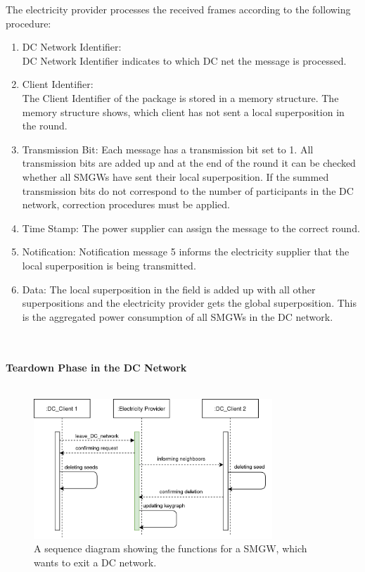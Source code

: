 The electricity provider processes the received frames according to the following procedure:\\
\begin{enumerate}
\item DC Network Identifier:\\
DC Network Identifier indicates to which DC net the message is processed.
\item Client Identifier:\\
The Client Identifier of the package is stored in a memory structure. The memory structure shows, which client has not sent a local superposition in the round.
\item Transmission Bit: Each message has a transmission bit set to 1. All transmission bits are added up and at the end of the round it can be checked whether all \gls{SMGW}s have sent their local superposition. If the summed transmission bits do not correspond to the number of participants in the DC network, correction procedures must be applied.
\item Time Stamp: The power supplier can assign the message to the correct round.
\item Notification: Notification message 5 informs the electricity supplier that the local superposition is being transmitted.
\item Data:
The local superposition in the field is added up with all other superpositions and the electricity provider gets the global superposition. This is the aggregated power consumption of all \gls{SMGW}s in the DC network.
\end{enumerate}
\\
\\
\textbf{Teardown Phase in the DC Network}
\\
\\
\begin{figure}[tbp]
  \centering
  \includegraphics[width=0.8\textwidth]{images/Exit2.png}
  \caption[Sequence Diagram Exiting]{A sequence diagram showing the functions for a SMGW, which wants to exit a DC network.}
  \label{fig:Exit}
\end{figure}
